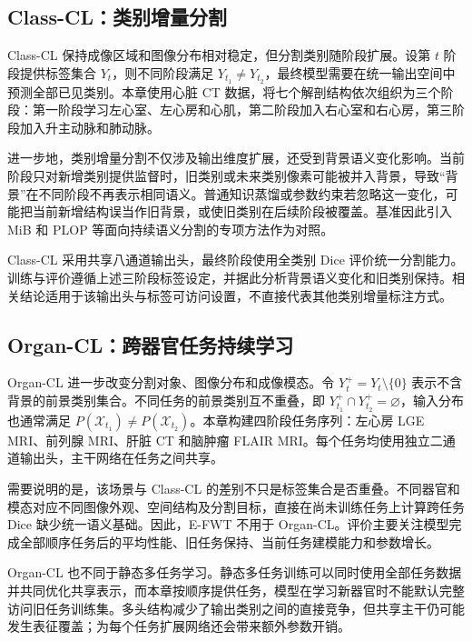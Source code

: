 \subsection{Class-CL：类别增量分割}
\label{subsec:benchmark-class-cl}

Class-CL 保持成像区域和图像分布相对稳定，但分割类别随阶段扩展。设第 $t$ 阶段提供标签集合 $Y_t$，则不同阶段满足 $Y_{t_1}\neq Y_{t_2}$，最终模型需要在统一输出空间中预测全部已见类别。本章使用心脏 CT 数据，将七个解剖结构依次组织为三个阶段：第一阶段学习左心室、左心房和心肌，第二阶段加入右心室和右心房，第三阶段加入升主动脉和肺动脉。

进一步地，类别增量分割不仅涉及输出维度扩展，还受到背景语义变化影响。当前阶段只对新增类别提供监督时，旧类别或未来类别像素可能被并入背景，导致“背景”在不同阶段不再表示相同语义。普通知识蒸馏或参数约束若忽略这一变化，可能把当前新增结构误当作旧背景，或使旧类别在后续阶段被覆盖。基准因此引入 MiB 和 PLOP 等面向持续语义分割的专项方法作为对照\cite{cermelli2020mib,douillard2021plop}。

Class-CL 采用共享八通道输出头，最终阶段使用全类别 Dice 评价统一分割能力。训练与评价遵循上述三阶段标签设定，并据此分析背景语义变化和旧类别保持。相关结论适用于该输出头与标签可访问设置，不直接代表其他类别增量标注方式。

\subsection{Organ-CL：跨器官任务持续学习}
\label{subsec:benchmark-organ-cl}

Organ-CL 进一步改变分割对象、图像分布和成像模态。令 $Y_t^{+}=Y_t\setminus\{0\}$ 表示不含背景的前景类别集合。不同任务的前景类别互不重叠，即
$Y^{+}_{t_1}\cap Y^{+}_{t_2}=\varnothing$，输入分布也通常满足
$P(\mathcal{X}_{t_1})\neq P(\mathcal{X}_{t_2})$。本章构建四阶段任务序列：左心房 LGE MRI、前列腺 MRI、肝脏 CT 和脑肿瘤 FLAIR MRI。每个任务均使用独立二通道输出头，主干网络在任务之间共享。

需要说明的是，该场景与 Class-CL 的差别不只是标签集合是否重叠。不同器官和模态对应不同图像外观、空间结构及分割目标，直接在尚未训练任务上计算跨任务 Dice 缺少统一语义基础。因此，E-FWT 不用于 Organ-CL。评价主要关注模型完成全部顺序任务后的平均性能、旧任务保持、当前任务建模能力和参数增长。

Organ-CL 也不同于静态多任务学习。静态多任务训练可以同时使用全部任务数据并共同优化共享表示，而本章按顺序提供任务，模型在学习新器官时不能默认完整访问旧任务训练集。多头结构减少了输出类别之间的直接竞争，但共享主干仍可能发生表征覆盖；为每个任务扩展网络还会带来额外参数开销。



